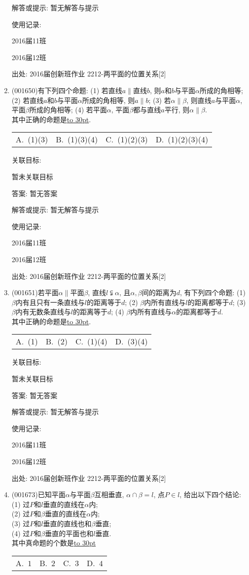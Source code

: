 \documentclass[10pt,a4paper]{article}
\newcommand{\blank}[1]{\underline{\hbox to #1pt{}}}
\newcommand{\fourch}[4]{\par\begin{tabular}{p{.23\textwidth}p{.23\textwidth}p{.23\textwidth}p{.23\textwidth}}
A.~#1 &B.~#2& C.~#3& D.~#4
\end{tabular}}
\begin{document}
\begin{enumerate}[1.]
解答或提示: 暂无解答与提示

使用记录:

2016届11班	

2016届12班	


出处: 2016届创新班作业	2212-两平面的位置关系[2]
\item { (001650)}有下列四个命题: (1) 若直线$a\parallel$直线$b$, 则$a$和$b$与平面$\alpha$所成的角相等; (2) 若直线$a$和$b$与平面$\alpha$所成的角相等, 则$a\parallel b$; (3) 若$\alpha\parallel \beta$, 则直线$a$与平面$\alpha$, 平面$\beta$所成的角相等; (4) 若平面$\alpha$, 平面$\beta$都与直线$a$平行, 则$\alpha\parallel \beta$.\\ 
其中正确的命题是\blank{30}.\\ 
\fourch{(1)(3)}{(1)(3)(4)}{(1)(2)(3)}{(1)(2)(3)(4)}


关联目标:

暂未关联目标

答案: 暂无答案

解答或提示: 暂无解答与提示

使用记录:

2016届11班	

2016届12班	


出处: 2016届创新班作业	2212-两平面的位置关系[2]
\item { (001651)}若平面$\alpha\parallel$平面$\beta$, 直线$l\subsetneqq \alpha$, 且$\alpha,\beta$间的距离为$d$, 有下列四个命题: (1) $\beta$内有且只有一条直线与$l$的距离等于$d$; (2) $\beta$内所有直线与$l$的距离都等于$d$; (3) $\beta$内有无数条直线与$l$的距离等于$d$; (4) $\beta$内所有直线与$\alpha$的距离都等于$d$.\\ 
其中正确的命题是\blank{30}.\\ 
\fourch{(1)}{(2)}{(1)(4)}{(3)(4)}


关联目标:

暂未关联目标

答案: 暂无答案

解答或提示: 暂无解答与提示

使用记录:

2016届11班	

2016届12班	


出处: 2016届创新班作业	2212-两平面的位置关系[2]
\item { (001673)}已知平面$\alpha$与平面$\beta$互相垂直, $\alpha\cap \beta=l$, 点$P\in l$, 给出以下四个结论:\\ 
(1) 过$P$和$l$垂直的直线在$\alpha$内;\\ 
(2) 过$P$和$\beta$垂直的直线在$\alpha$内;\\ 
(3) 过$P$和$l$垂直的直线也和$\beta$垂直;\\ 
(4) 过$P$和$\beta$垂直的平面也和$l$垂直.\\ 
其中真命题的个数是\blank{30}\\ 
\fourch{$1$}{$2$}{$3$}{$4$}



\end{enumerate}
\end{document}
